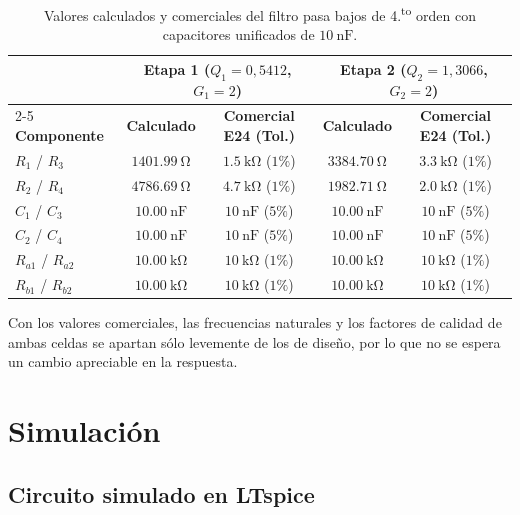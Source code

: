 \begin{table}[!ht]
  \centering
  \begin{tabular}{|l|c|c|c|c|}
    \hline
    & \multicolumn{2}{c|}{Etapa 1 ($Q_1 = 0{,}5412$, $G_1 = 2$)}
    & \multicolumn{2}{c|}{Etapa 2 ($Q_2 = 1{,}3066$, $G_2 = 2$)} \\
    \cline{2-5}
    \textbf{Componente} & \textbf{Calculado} & \textbf{Comercial E24 (Tol.)} & \textbf{Calculado} & \textbf{Comercial E24 (Tol.)} \\
    \hline
    $R_1$ / $R_3$ & $\SI{1401.99}{\ohm}$ & $\SI{1.5}{\kilo\ohm}$ ($1\%$) & $\SI{3384.70}{\ohm}$ & $\SI{3.3}{\kilo\ohm}$ ($1\%$) \\
    $R_2$ / $R_4$ & $\SI{4786.69}{\ohm}$ & $\SI{4.7}{\kilo\ohm}$ ($1\%$) & $\SI{1982.71}{\ohm}$ & $\SI{2.0}{\kilo\ohm}$ ($1\%$) \\
    $C_1$ / $C_3$ & $\SI{10.00}{\nano\farad}$ & $\SI{10}{\nano\farad}$ ($5\%$) & $\SI{10.00}{\nano\farad}$ & $\SI{10}{\nano\farad}$ ($5\%$) \\
    $C_2$ / $C_4$ & $\SI{10.00}{\nano\farad}$ & $\SI{10}{\nano\farad}$ ($5\%$) & $\SI{10.00}{\nano\farad}$ & $\SI{10}{\nano\farad}$ ($5\%$) \\
    $R_{a1}$ / $R_{a2}$ & $\SI{10.00}{\kilo\ohm}$ & $\SI{10}{\kilo\ohm}$ ($1\%$) & $\SI{10.00}{\kilo\ohm}$ & $\SI{10}{\kilo\ohm}$ ($1\%$) \\
    $R_{b1}$ / $R_{b2}$ & $\SI{10.00}{\kilo\ohm}$ & $\SI{10}{\kilo\ohm}$ ($1\%$) & $\SI{10.00}{\kilo\ohm}$ & $\SI{10}{\kilo\ohm}$ ($1\%$) \\
    \hline
  \end{tabular}
  \caption{Valores calculados y comerciales del filtro pasa bajos de 4.\textsuperscript{to} orden con capacitores unificados de $\SI{10}{\nano\farad}$.}
  \label{tab:pb-componentes}
\end{table}

Con los valores comerciales, las frecuencias naturales y los factores de calidad de ambas celdas se apartan sólo
levemente de los de diseño, por lo que no se espera un cambio apreciable en la respuesta.

\section{Simulación}
\label{sec:pb-simulacion}

\subsection{Circuito simulado en LTspice}
\label{subsec:pb-sim-circuito}


